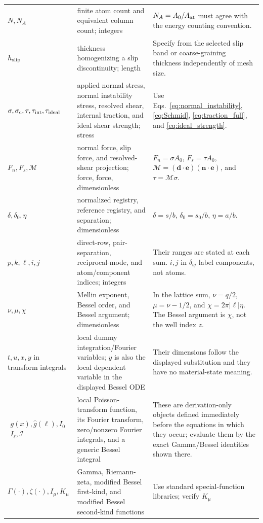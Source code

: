 \begin{longtable}{>{\raggedright\arraybackslash}p{}
                  >{\raggedright\arraybackslash}p{}
                  >{\raggedright\arraybackslash}p{}}
$N,N_A$ & finite atom count and equivalent column count; integers & $N_A=A_0/A_{\rm at}$ must agree
with the energy counting convention.\\
$h_{\rm slip}$ & thickness homogenizing a slip discontinuity; length & Specify from the selected
slip band or coarse-graining thickness independently of mesh size.\\
$\sigma,\sigma_{\rm c},\tau,\tau_{\rm int},\tau_{\rm ideal}$ & applied normal stress, normal
instability stress, resolved shear, internal traction, and ideal shear strength; stress & Use
Eqs.~\eqref{eq:normal_instability}, \eqref{eq:Schmid}, \eqref{eq:traction_full}, and
\eqref{eq:ideal_strength}.\\
$F_n,F_s,\mathcal M$ & normal force, slip force, and resolved-shear projection; force, force,
dimensionless & $F_n=\sigma A_0$, $F_s=\tau A_0$,
$\mathcal M=(\bm d\mathbin{\cdot}\bm e)(\bm n\mathbin{\cdot}\bm e)$, and
$\tau=\mathcal M\sigma$.\\
$\delta,\delta_0,\eta$ & normalized registry, reference registry, and separation; dimensionless &
$\delta=s/b$, $\delta_0=s_0/b$, $\eta=a/b$.\\
$p,k,\ell,i,j$ & direct-row, pair-separation, reciprocal-mode, and atom/component indices; integers
& Their ranges are stated at each sum. $i,j$ in $\delta_{ij}$ label components, not atoms.\\
$\nu,\mu,\chi$ & Mellin exponent, Bessel order, and Bessel argument; dimensionless & In the lattice
sum, $\nu=q/2$, $\mu=\nu-1/2$, and $\chi=2\pi|\ell|\eta$. The Bessel argument is $\chi$, not the
well index $z$.\\
$t,u,x,y$ in transform integrals & local dummy integration/Fourier variables; $y$ is also the
local dependent variable in the displayed Bessel ODE & Their dimensions follow the displayed
substitution and they have no material-state meaning.\\
$\begin{gathered}g(x),\widehat g(\ell),I_0\\I_\ell,\mathcal I\end{gathered}$ & local Poisson-transform function, its Fourier
transform, zero/nonzero Fourier integrals, and a generic Bessel integral & These are derivation-only
objects defined immediately before the equations in which they occur; evaluate them by the exact
Gamma/Bessel identities shown there.\\
$\Gamma(\cdot),\zeta(\cdot),I_\mu,K_\mu$ & Gamma, Riemann-zeta, modified Bessel first-kind, and
modified Bessel second-kind functions & Use standard special-function libraries; verify $K_\mu$

\end{longtable}
